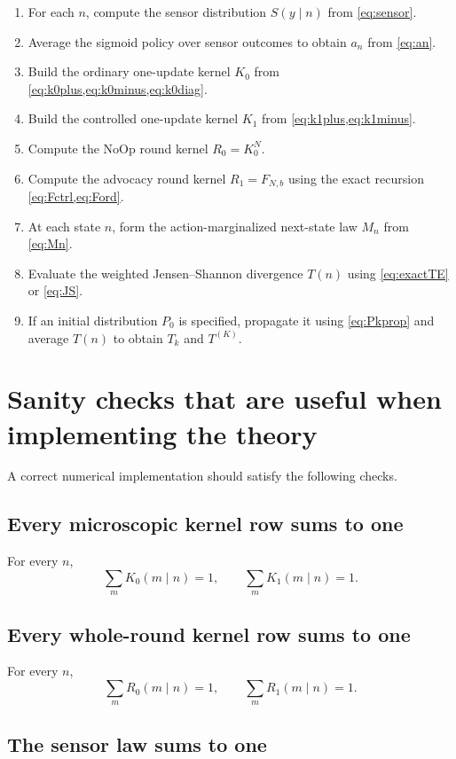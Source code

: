\documentclass[11pt,a4paper]{article}
\newcommand{\NoOp}{\ensuremath{\mathrm{NoOp}}}
\newcommand{\1}{\mathbbm{1}}
\begin{document}
\begin{enumerate}[leftmargin=1.8em,label=\textbf{Step \arabic*.}]
\item For each $n$, compute the sensor distribution $S(y\mid n)$ from \cref{eq:sensor}.
\item Average the sigmoid policy over sensor outcomes to obtain $a_n$ from \cref{eq:an}.
\item Build the ordinary one-update kernel $K_0$ from \cref{eq:k0plus,eq:k0minus,eq:k0diag}.
\item Build the controlled one-update kernel $K_1$ from \cref{eq:k1plus,eq:k1minus}.
\item Compute the \NoOp{} round kernel $R_0=K_0^N$.
\item Compute the advocacy round kernel $R_1=F_{N,b}$ using the exact recursion \cref{eq:Fctrl,eq:Ford}.
\item At each state $n$, form the action-marginalized next-state law $M_n$ from \cref{eq:Mn}.
\item Evaluate the weighted Jensen--Shannon divergence $T(n)$ using \cref{eq:exactTE} or \cref{eq:JS}.
\item If an initial distribution $P_0$ is specified, propagate it using \cref{eq:Pkprop} and average $T(n)$ to obtain $T_k$ and $T^{(K)}$.
\end{enumerate}

\section{Sanity checks that are useful when implementing the theory}

A correct numerical implementation should satisfy the following checks.

\subsection{Every microscopic kernel row sums to one}

For every $n$,
\[
\sum_m K_0(m\mid n)=1,
\qquad
\sum_m K_1(m\mid n)=1.
\]

\subsection{Every whole-round kernel row sums to one}

For every $n$,
\[
\sum_m R_0(m\mid n)=1,
\qquad
\sum_m R_1(m\mid n)=1.
\]

\subsection{The sensor law sums to one}
\end{document}
